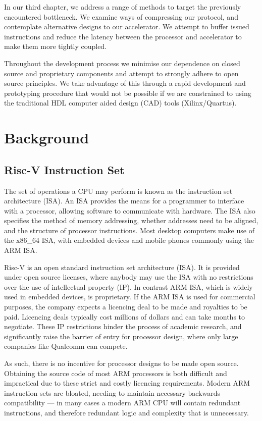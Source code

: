 \documentclass[a4paper,8pt]{report}
\begin{document}
In our third chapter, we address a range of methods to target the previously
encountered bottleneck. We examine ways of compressing our protocol, and
contemplate alternative designs to our accelerator. We attempt to buffer issued
instructions and reduce the latency between the processor and accelerator to
make them more tightly coupled.

Throughout the development process we minimise our dependence on closed source
and proprietary components and attempt to strongly adhere to open source
principles. We take advantage of this through a rapid development and
prototyping procedure that would not be possible if we are constrained to using
the traditional HDL computer aided design (CAD) tools (Xilinx/Quartus).


\chapter{Background}
\section{Risc-V Instruction Set}
The set of operations a CPU may perform is known as the instruction set
architecture (ISA). An ISA provides the means for a
programmer to interface with a processor, allowing software to communicate with
hardware. The ISA also specifies the method of memory addressing, whether
addresses need to be aligned, and the structure of processor instructions. Most
desktop computers make use of the x86\_64 ISA, with embedded devices and mobile
phones commonly using the ARM ISA.


Risc-V is an open standard instruction set architecture (ISA). It is provided
under open source licenses, where anybody may use the ISA with no restrictions
over the use of intellectual property (IP). In contrast ARM ISA, which is widely
used in embedded devices, is proprietary. If the ARM ISA is used
for commercial purposes, the company expects a licencing deal to be made and
royalties to be paid. Licencing deals typically cost millions of dollars and can
take months to negotiate. These IP restrictions hinder the process of academic
research, and significantly raise the barrier of entry for processor design,
where only large companies like Qualcomm can compete.

As such, there is no incentive for processor designs to be made open source.
Obtaining the source code of most ARM processors is both difficult and
impractical due to these strict and costly licencing requirements. Modern ARM
instruction sets are bloated, needing to maintain necessary backwards
compatibility --- in many cases a modern ARM CPU will contain redundant
instructions, and therefore redundant logic and complexity that is unnecessary.
\end{document}
